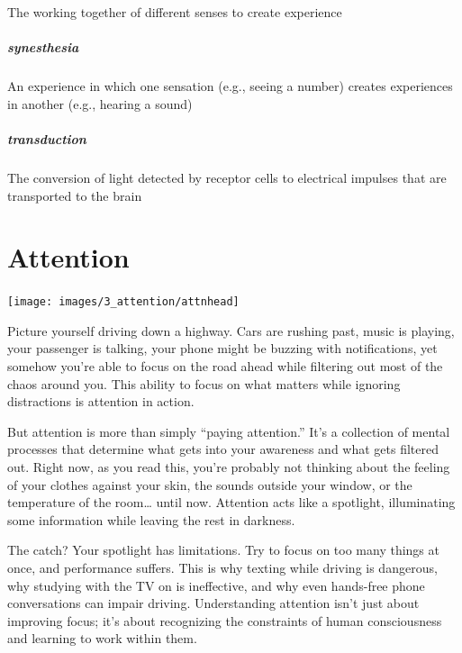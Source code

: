 \documentclass[
]{krantz}
\begin{document}
The working together of different senses to create experience

\paragraph*{synesthesia}\label{synesthesia}

An experience in which one sensation (e.g., seeing a number) creates experiences in another (e.g., hearing a sound)

\paragraph*{transduction}\label{transduction}

The conversion of light detected by receptor cells to electrical impulses that are transported to the brain

\chapter{Attention}\label{attention}

\begin{center}\texttt{[image: images/3\_attention/attnhead]} \end{center}

Picture yourself driving down a highway. Cars are rushing past, music is playing, your passenger is talking, your phone might be buzzing with notifications, yet somehow you're able to focus on the road ahead while filtering out most of the chaos around you. This ability to focus on what matters while ignoring distractions is attention in action.

But attention is more than simply ``paying attention.'' It's a collection of mental processes that determine what gets into your awareness and what gets filtered out. Right now, as you read this, you're probably not thinking about the feeling of your clothes against your skin, the sounds outside your window, or the temperature of the room\ldots{} until now. Attention acts like a spotlight, illuminating some information while leaving the rest in darkness.

The catch? Your spotlight has limitations. Try to focus on too many things at once, and performance suffers. This is why texting while driving is dangerous, why studying with the TV on is ineffective, and why even hands-free phone conversations can impair driving. Understanding attention isn't just about improving focus; it's about recognizing the constraints of human consciousness and learning to work within them.
\end{document}
